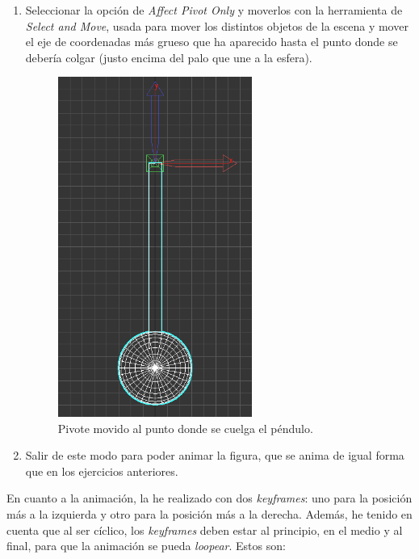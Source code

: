 \documentclass{article}
\begin{document}
\begin{enumerate}
    \item Seleccionar la opción de \textit{Affect Pivot Only} y moverlos con la herramienta de \textit{Select and Move}, usada para mover los distintos objetos de la escena y mover el eje de coordenadas más grueso que ha aparecido hasta el punto donde se debería colgar (justo encima del palo que une a la esfera).
    
	\begin{figure}[H]
	    \centering
	    \includegraphics[width=0.6\textwidth]{imagenes/Ejercicio 3/pivote_pivot.png}
        \caption{Pivote movido al punto donde se cuelga el péndulo.}
	\end{figure}


    \item Salir de este modo para poder animar la figura, que se anima de igual forma que en los ejercicios anteriores.
\end{enumerate}

En cuanto a la animación, la he realizado con dos \textit{keyframes}: uno para la posición más a la izquierda y otro para la posición más a la derecha. Además, he tenido en cuenta que al ser cíclico, los \textit{keyframes} deben estar al principio, en el medio y al final, para que la animación se pueda \textit{loopear}. Estos son:
\end{document}
